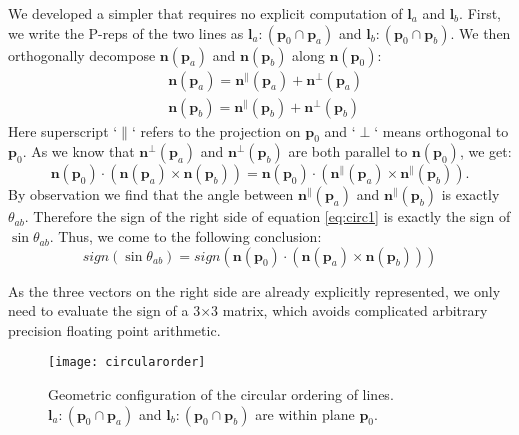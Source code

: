 We developed a simpler that requires no explicit computation of $\bm{l}_a$ and $\bm{l}_b$. First, we write the P-reps of the two lines as $\bm{l}_a\colon(\bm{p}_0\cap\bm{p}_a)$ and $\bm{l}_b\colon(\bm{p}_0\cap\bm{p}_b)$. We then orthogonally decompose $\bm{n}(\bm{p}_a)$ and $\bm{n}(\bm{p}_b)$ along $\bm{n}(\bm{p}_0)$:
\begin{equation}
\begin{split}
&\bm{n}(\bm{p}_a)= \bm{n}^\parallel(\bm{p}_a) + \bm{n}^\perp(\bm{p}_a)\\
&\bm{n}(\bm{p}_b)= \bm{n}^\parallel(\bm{p}_b) + \bm{n}^\perp(\bm{p}_b)
\end{split}
\end{equation}
Here superscript `$\parallel$` refers to the projection on $\bm{p}_0$ and `$\perp$` means orthogonal to $\bm{p}_0$. As we know that $\bm{n}^\perp(\bm{p}_a)$ and $\bm{n}^\perp(\bm{p}_b)$ are both parallel to $\bm{n}(\bm{p}_0)$, we get:
\begin{equation}
\label{eq:circ1}
\bm{n}(\bm{p}_0) \cdot (\bm{n}(\bm{p}_a) \times \bm{n}(\bm{p}_b)) = \bm{n}(\bm{p}_0) \cdot (\bm{n}^\parallel(\bm{p}_a) \times \bm{n}^\parallel(\bm{p}_b)).
\end{equation}
By observation we find that the angle between $\bm{n}^\parallel(\bm{p}_a)$ and $\bm{n}^\parallel(\bm{p}_b)$ is exactly $\theta_{ab}$. Therefore the sign of the right side of equation \ref{eq:circ1} is exactly the sign of $\sin{\theta_{ab}}$. Thus, we come to the following conclusion:
\begin{equation}
\label{eq:circ2}
sign(\sin{\theta_{ab}})=  sign(\bm{n}(\bm{p}_0)\cdot(\bm{n}(\bm{p}_a) \times \bm{n}(\bm{p}_b)))
\end{equation}

As the three vectors on the right side are already explicitly represented, we only need to evaluate the sign of a 3$\times$3 matrix, which avoids complicated arbitrary precision floating point arithmetic.

\begin{figure}[t]
\centering
\texttt{[image: circularorder]}
\caption{Geometric configuration of the circular ordering of lines. $\bm{l}_a\colon(\bm{p}_0 \cap \bm{p}_a)$ and $\bm{l}_b\colon(\bm{p}_0 \cap \bm{p}_b)$ are within plane $\bm{p}_0$.}
\label{fig:circularorder}
\end{figure}


